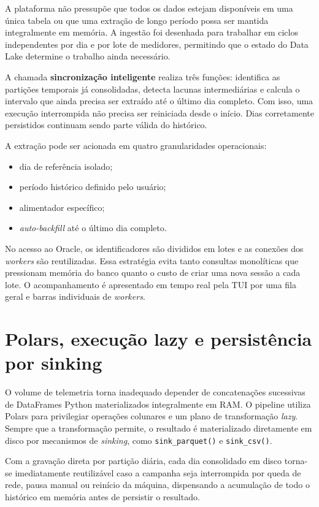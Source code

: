A plataforma não pressupõe que todos os dados estejam disponíveis em uma única tabela ou que uma extração de longo período possa ser mantida integralmente em memória. A ingestão foi desenhada para trabalhar em ciclos independentes por dia e por lote de medidores, permitindo que o estado do Data Lake determine o trabalho ainda necessário.

A chamada \textbf{sincronização inteligente} realiza três funções: identifica as partições temporais já consolidadas, detecta lacunas intermediárias e calcula o intervalo que ainda precisa ser extraído até o último dia completo. Com isso, uma execução interrompida não precisa ser reiniciada desde o início. Dias corretamente persistidos continuam sendo parte válida do histórico.

A extração pode ser acionada em quatro granularidades operacionais:

\begin{itemize}
\item
  dia de referência isolado;
\item
  período histórico definido pelo usuário;
\item
  alimentador específico;
\item
  \emph{auto-backfill} até o último dia completo.
\end{itemize}

No acesso ao Oracle, os identificadores são divididos em lotes e as conexões dos \emph{workers} são reutilizadas. Essa estratégia evita tanto consultas monolíticas que pressionam memória do banco quanto o custo de criar uma nova sessão a cada lote. O acompanhamento é apresentado em tempo real pela TUI por uma fila geral e barras individuais de \emph{workers}.

\section{Polars, execução lazy e persistência por sinking}\label{polars-execuuxe7uxe3o-lazy-e-persistuxeancia-por-sinking}

O volume de telemetria torna inadequado depender de concatenações sucessivas de DataFrames Python materializados integralmente em RAM. O pipeline utiliza Polars para privilegiar operações colunares e um plano de transformação \emph{lazy}. Sempre que a transformação permite, o resultado é materializado diretamente em disco por mecanismos de \emph{sinking}, como \texttt{sink\_parquet()} e \texttt{sink\_csv()}.

Com a gravação direta por partição diária, cada dia consolidado em disco torna-se imediatamente reutilizável caso a campanha seja interrompida por queda de rede, pausa manual ou reinício da máquina, dispensando a acumulação de todo o histórico em memória antes de persistir o resultado.

